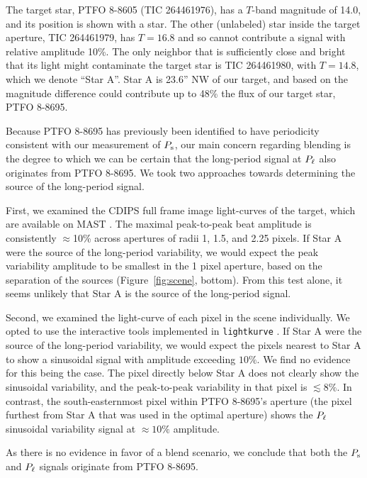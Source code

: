 \documentclass[12pt,twocolumn,tighten]{aastex62}
\begin{document}
The target star, PTFO
8-8605 (TIC 264461976), has a $T$-band magnitude of 14.0, and its position is shown with a
star.  
The other (unlabeled) star inside the target aperture, TIC 264461979, has $T=16.8$ and so cannot
contribute a signal with relative amplitude 10\%.
The only neighbor that is sufficiently close and bright that
its light might contaminate the target star is TIC 264461980, with
$T=14.8$, which we denote ``Star A''.  Star A is 23.6'' NW of our
target, and based on the magnitude difference could contribute up to
48\% the flux of our target star, PTFO 8-8695.  

Because PTFO 8-8695 has previously been identified to have periodicity
consistent with our measurement of $P_{\rm s}$, our main concern
regarding blending is the degree to which we can be certain that the
long-period signal at $P_{\rm \ell}$ also originates from PTFO 8-8695.
We took two approaches towards determining the source of the long-period signal.

First, we examined the CDIPS full frame image light-curves of the
target, which are available on MAST \citep{bouma_cluster_2019}.
The maximal peak-to-peak beat amplitude is consistently $\approx$10\%
across apertures of radii 1, 1.5, and 2.25 pixels.
If Star A were the source of the long-period variability, we would expect the
peak variability amplitude to be smallest in the 1 pixel aperture, based on the
separation of the sources (Figure~\ref{fig:scene}, bottom).
From this test alone, it seems unlikely that Star A is the source of
the long-period signal.

Second, we examined the light-curve of each pixel in the scene
individually.  We opted to use the
interactive tools implemented in
\texttt{lightkurve} \citep{lightkurve_2018}.  If Star A were the
source of the long-period variability, we would expect the pixels
nearest to Star A to show a sinusoidal signal with
amplitude exceeding $10\%$.  We find no evidence for
this being the case.  The pixel directly below Star A does not
clearly show the sinusoidal variability, and the peak-to-peak 
variability in that pixel is $\lesssim 8\%$.  In contrast, the
south-easternmost pixel within PTFO 8-8695's aperture (the pixel 
furthest from Star A that was used in the optimal aperture) shows the $P_{\rm \ell}$ sinusoidal
variability signal at $\approx 10\%$ amplitude.

As there is no evidence in favor of a blend scenario, we
conclude that both the $P_{\rm s}$ and $P_{\rm \ell}$ signals originate from PTFO 8-8695.
\end{document}
